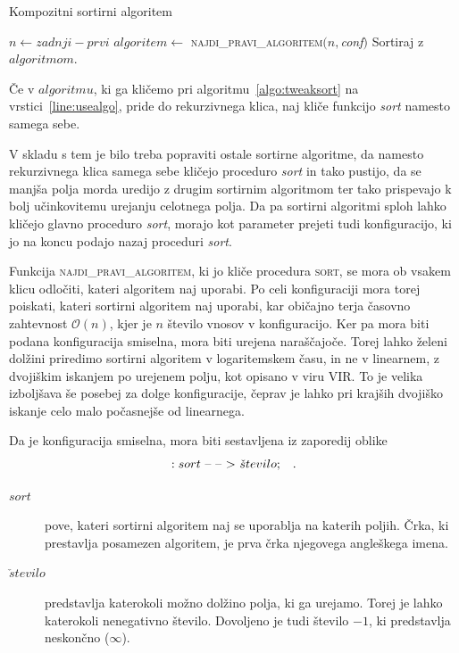 \documentclass[a4paper,oneside,12pt]{article}
\newcommand{\konfarrow}{\mbox{--}~\mbox{--}~\mbox{\ensuremath{>}}}
\newcommand{\edot}{\;\;\;.}
\begin{document}
\begin{algorithm}[h!t!]
  \caption{Kompozitni sortirni algoritem}\label{algo:tweaksort}
  \begin{algorithmic}[1]
        \State $n \gets zadnji - prvi$
        \State $algoritem \gets$ \textsc{najdi\_pravi\_algoritem}$(n, $\emph{conf}$)$
        \State \label{line:usealgo}Sortiraj z $algoritmom$.
    \EndFunction
  \end{algorithmic}
\end{algorithm}

Če v $algoritmu$, ki ga kličemo pri algoritmu~\ref{algo:tweaksort} na
vrstici~\ref{line:usealgo}, pride do rekurzivnega klica, naj kliče funkcijo \emph{sort} namesto
samega sebe.

V skladu s tem je bilo treba popraviti ostale sortirne algoritme, da namesto rekurzivnega
klica samega sebe kličejo proceduro \emph{sort} in tako pustijo, da se manjša polja morda uredijo z
drugim sortirnim algoritmom ter tako prispevajo k bolj učinkovitemu urejanju celotnega polja. Da pa
sortirni algoritmi sploh lahko kličejo glavno proceduro \emph{sort}, morajo kot
parameter prejeti tudi konfiguracijo, ki jo na koncu podajo nazaj proceduri \emph{sort}.

Funkcija \textsc{najdi\_pravi\_algoritem}, ki jo kliče procedura \textsc{sort}, se mora ob vsakem klicu odločiti, kateri
algoritem naj uporabi. Po celi konfiguraciji mora torej poiskati, kateri sortirni algoritem
naj uporabi, kar običajno terja časovno zahtevnost
$\mathcal{O}(n)$, kjer je $n$ število vnosov v konfiguracijo. Ker pa mora biti podana konfiguracija
smiselna, mora biti urejena naraščajoče. Torej lahko želeni dolžini priredimo sortirni
algoritem v logaritemskem času, in ne v linearnem, z dvojiškim iskanjem po urejenem polju, 
kot opisano v viru VIR. To je velika izboljšava še posebej za dolge konfiguracije, čeprav je lahko
pri krajših dvojiško iskanje celo malo počasnejše od linearnega.

Da je konfiguracija smiselna, mora biti sestavljena iz zaporedij oblike
\[ :sort\ \konfarrow\ \check{s}tevilo; \edot\]
\begin{description}
  \item[$sort$] pove, kateri sortirni algoritem naj se uporablja na katerih poljih. Črka, ki
    prestavlja posamezen algoritem, je prva črka njegovega angleškega imena.
  \item[$\check{s}tevilo$] predstavlja katerokoli možno dolžino polja, ki ga urejamo. Torej je lahko
    katerokoli nenegativno število. Dovoljeno je tudi število $-1$, ki predstavlja neskončno
($\infty$).
\end{description}
\end{document}
